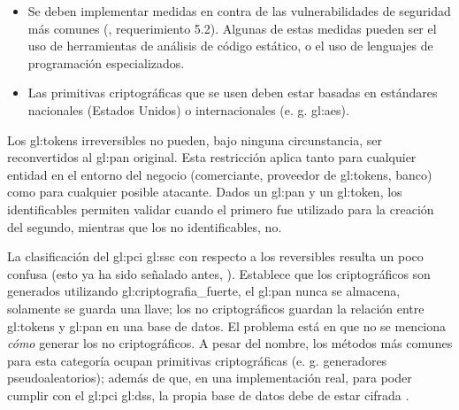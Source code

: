 \begin{itemize}
  \item Se deben implementar medidas en contra de las vulnerabilidades de
    seguridad más comunes (\cite{dss_pa}, requerimiento 5.2). Algunas de estas
    medidas pueden ser el uso de herramientas de análisis de código estático,
    o el uso de lenguajes de programación especializados.

  \item Las primitivas criptográficas que se usen deben estar basadas en
    estándares nacionales (Estados Unidos) o internacionales (e. g.
    \gls{gl:aes}).
\end{itemize}

Los \glspl{gl:token} irreversibles no pueden, bajo ninguna circunstancia, ser
reconvertidos al \gls{gl:pan} original. Esta restricción aplica tanto para
cualquier entidad en el entorno del negocio (comerciante, proveedor de
\glspl{gl:token}, banco) como para cualquier posible atacante. Dados un
\gls{gl:pan} y un \gls{gl:token}, los identificables permiten validar cuando el
primero fue utilizado para la creación del segundo, mientras que los no
identificables, no.



La clasificación del \gls{gl:pci} \gls{gl:ssc} con respecto a los reversibles
resulta un poco confusa (esto ya ha sido señalado antes, \cite{doc_sandra}).
Establece que los criptográficos son generados utilizando
\gls{gl:criptografia_fuerte}, el \gls{gl:pan} nunca se almacena, solamente se
guarda una llave; los no criptográficos guardan la relación entre
\glspl{gl:token} y \gls{gl:pan} en una base de datos. El problema está en que
no se menciona \textit{cómo} generar los no criptográficos. A pesar del nombre,
los métodos más comunes para esta categoría ocupan primitivas criptográficas
(e. g. generadores pseudoaleatorios); además de que, en una implementación
real, para poder cumplir con el \gls{gl:pci} \gls{gl:dss}, la propia base de
datos debe de estar cifrada \cite{pci_dss}.





